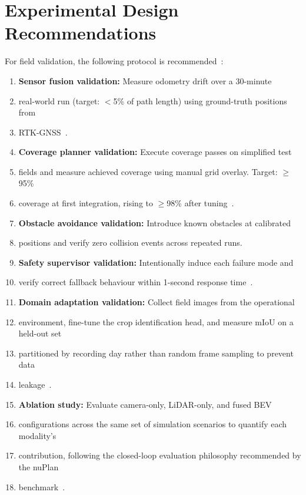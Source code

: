 \documentclass[12pt, a4paper]{article}
\begin{document}
\section{Experimental Design Recommendations}

For field validation, the following protocol is recommended~\cite{ref1, ref2, ref154}:

\begin{enumerate}
  \item \textbf{Sensor fusion validation:} Measure odometry drift over a 30-minute
  \item real-world run (target: $<$5\% of path length) using ground-truth positions from
  \item RTK-GNSS~\cite{ref1}.
  \item \textbf{Coverage planner validation:} Execute coverage passes on simplified test
  \item fields and measure achieved coverage using manual grid overlay. Target: $\geq$95\%
  \item coverage at first integration, rising to $\geq$98\% after tuning~\cite{ref1}.
  \item \textbf{Obstacle avoidance validation:} Introduce known obstacles at calibrated
  \item positions and verify zero collision events across repeated runs.
  \item \textbf{Safety supervisor validation:} Intentionally induce each failure mode and
  \item verify correct fallback behaviour within 1-second response time~\cite{ref2}.
  \item \textbf{Domain adaptation validation:} Collect field images from the operational
  \item environment, fine-tune the crop identification head, and measure mIoU on a held-out set
  \item partitioned by recording day rather than random frame sampling to prevent data
  \item leakage~\cite{ref2, ref154}.
  \item \textbf{Ablation study:} Evaluate camera-only, LiDAR-only, and fused BEV
  \item configurations across the same set of simulation scenarios to quantify each modality's
  \item contribution, following the closed-loop evaluation philosophy recommended by the nuPlan
  \item benchmark~\cite{ref139, ref141}.
\end{enumerate}

\printbibliography[heading=bibintoc, title={References}]
\end{document}
